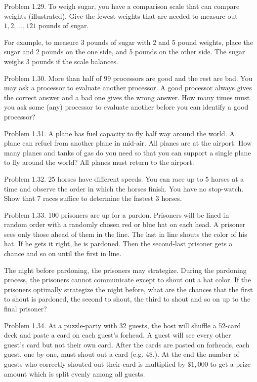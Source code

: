 \documentclass[10pt]{article}
\begin{document}
Problem 1.29. To weigh sugar, you have a comparison scale that can compare weights (illustrated). Give the fewest weights that are needed to measure out $1,2, \ldots, 121$ pounds of sugar.

For example, to measure 3 pounds of sugar with 2 and 5 pound weights, place the sugar and 2 pounds on the one side, and 5 pounds on the other side. The sugar weighs 3 pounds if the scale balances.


Problem 1.30. More than half of 99 processors are good and the rest are bad. You may ask a processor to evaluate another processor. A good processor always gives the correct answer and a bad one gives the wrong answer. How many times must you ask some (any) processor to evaluate another before you can identify a good processor?


Problem 1.31. A plane has fuel capacity to fly half way around the world. A plane can refuel from another plane in mid-air. All planes are at the airport. How many planes and tanks of gas do you need so that you can support a single plane to fly around the world? All planes must return to the airport.

Problem 1.32. 25 horses have different speeds. You can race up to 5 horses at a time and observe the order in which the horses finish. You have no stop-watch. Show that 7 races suffice to determine the fastest 3 horses.

Problem 1.33. 100 prisoners are up for a pardon. Prisoners will be lined in random order with a randomly chosen red or blue hat on each head. A prisoner sees only those ahead of them in the line. The last in line shouts the color of his hat. If he gets it right, he is pardoned. Then the second-last prisoner gets a chance and so on until the first in line.

The night before pardoning, the prisoners may strategize. During the pardoning process, the prisoners cannot communicate except to shout out a hat color. If the prisoners optimally strategize the night before, what are the chances that the first to shout is pardoned, the second to shout, the third to shout and so on up to the final prisoner?

Problem 1.34. At a puzzle-party with 32 guests, the host will shuffle a 52-card deck and paste a card on each guest's forhead. A guest will see every other guest's card but not their own card. After the cards are pasted on forheads, each guest, one by one, must shout out a card (e.g. 4\$.). At the end the number of guests who correctly shouted out their card is multiplied by $\$ 1,000$ to get a prize amount which is split evenly among all guests.
\end{document}
